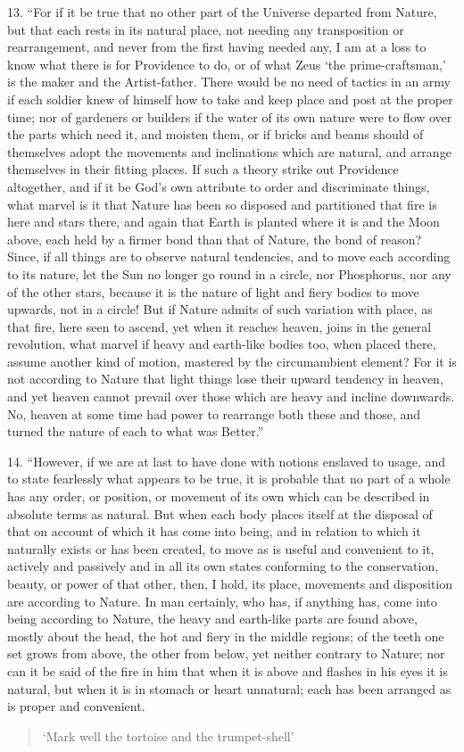 \documentclass[a4paper, 11pt, oneside, polutonikogreek, english]{article}
\begin{document}
13. ``For if it be true that no other part of the Universe departed from Nature, but that each rests in its natural place, not needing any transposition or rearrangement, and never from the first having needed any, I am at a loss to know what there is for Providence to do, or of what Zeus `the prime-craftsman,' is the maker and the Artist-father. There would be no need of tactics in an army if each soldier knew of himself how to take and keep place and post at the proper time; nor of gardeners or builders if the water of its own nature were to flow over the parts which need it, and moisten them, or if bricks and beams should of themselves adopt the movements and inclinations which are natural, and arrange themselves in their fitting places. If such a theory strike out Providence altogether, and if it be God's own attribute to order and discriminate things, what marvel is it that Nature has been so disposed and partitioned that fire is here and stars there, and again that Earth is planted where it is and the Moon above, each held by a firmer bond than that of Nature, the bond of reason? Since, if all things are to observe natural tendencies, and to move each according to its nature, let the Sun no longer go round in a circle, nor Phosphorus, nor any of the other stars, because it is the nature of light and fiery bodies to move upwards, not in a circle! But if Nature admits of such variation with place, as that fire, here seen to ascend, yet when it reaches heaven, joins in the general revolution, what marvel if heavy and earth-like bodies too, when placed there, assume another kind of motion, mastered by the circumambient element? For it is not according to Nature that light things lose their upward tendency in heaven, and yet heaven cannot prevail over those which are heavy and incline downwards. No, heaven at some time had power to rearrange both these and those, and turned the nature of each to what was Better.''

14. ``However, if we are at last to have done with notions enslaved to usage, and to state fearlessly what appears to be true, it is probable that no part of a whole has any order, or position, or movement of its own which can be described in absolute terms as natural. But when each body places itself at the disposal of that on account of which it has come into being, and in relation to which it naturally exists or has been created, to move as is useful and convenient to it, actively and passively and in all its own states conforming to the conservation, beauty, or power of that other, then, I hold, its place, movements and disposition are according to Nature. In man certainly, who has, if anything has, come into being according to Nature, the heavy and earth-like parts are found above, mostly about the head, the hot and fiery in the middle regions; of the teeth one set grows from above, the other from below, yet neither contrary to Nature; nor can it be said of the fire in him that when it is above and flashes in his eyes it is natural, but when it is in stomach or heart unnatural; each has been arranged as is proper and convenient.
\begin{quotation}
`Mark well the tortoise and the trumpet-shell'
 \end{quotation}
\end{document}
